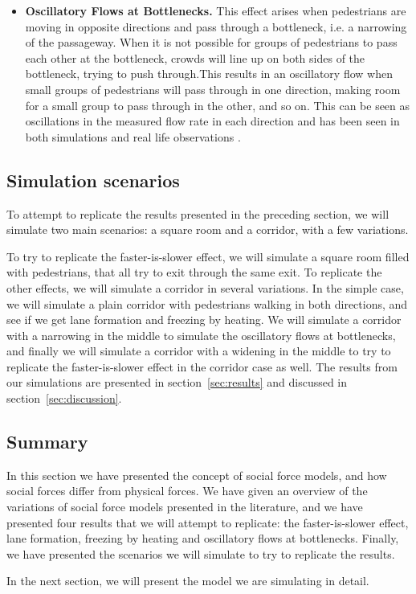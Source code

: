 \begin{itemize}
    \item \textbf{Oscillatory Flows at Bottlenecks.}
        This effect arises when pedestrians are moving in opposite directions 
        and pass through a bottleneck, i.e. a narrowing of the passageway.  
        When it is not possible for groups of pedestrians to pass each other 
        at the bottleneck, crowds will line up on both sides of the 
        bottleneck, trying to push through.This results in an oscillatory flow 
        when small groups of pedestrians will pass through in one direction, 
        making room for a small group to pass through in the other, and so on.
        This can be seen as oscillations in the measured flow rate in each 
        direction and has been seen in both simulations and real life 
        observations \cite{self-org}.
\end{itemize}

\subsection{Simulation scenarios}
To attempt to replicate the results presented in the preceding section, we 
will simulate two main scenarios: a square room and a corridor, with a few 
variations.

To try to replicate the faster-is-slower effect, we will simulate 
a square room filled with pedestrians, that all try to exit through the same 
exit. To replicate the other effects, we will simulate a corridor in several 
variations. In the simple case, we will simulate a plain corridor with 
pedestrians walking in both directions, and see if we get lane formation and 
freezing by heating. We will simulate a corridor with a narrowing in the 
middle to simulate the oscillatory flows at bottlenecks, and finally we will 
simulate a corridor with a widening in the middle to try to replicate the 
faster-is-slower effect in the corridor case as well. The results from our 
simulations are presented in section~\ref{sec:results} and discussed in 
section~\ref{sec:discussion}.

\subsection{Summary}
In this section we have presented the concept of social force models, and how 
social forces differ from physical forces. We have given an overview of the 
variations of social force models presented in the literature, and we have 
presented four results that we will attempt to replicate: the faster-is-slower 
effect, lane formation, freezing by heating and oscillatory flows at 
bottlenecks. Finally, we have presented the scenarios we will simulate to try 
to replicate the results.

In the next section, we will present the model we are simulating in detail.
